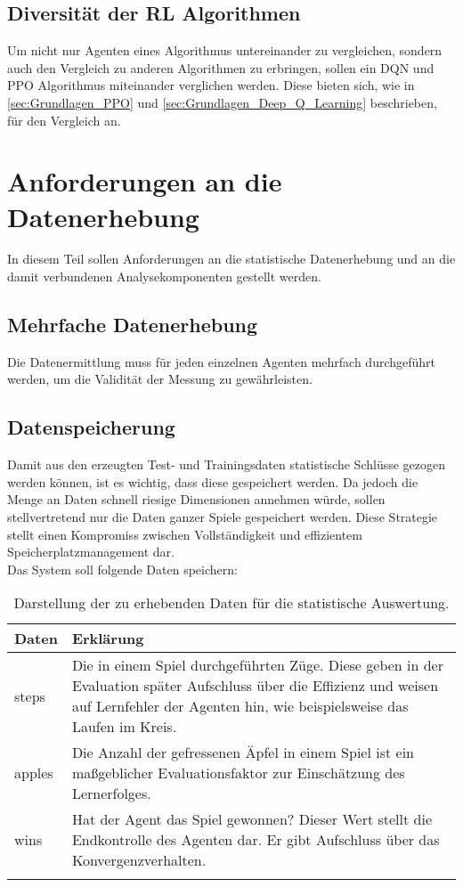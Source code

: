 \subsection{Diversität der RL Algorithmen} \label{subsec:Anforderungen_Diversität}
Um nicht nur Agenten eines Algorithmus untereinander zu vergleichen, sondern auch den Vergleich zu anderen Algorithmen zu erbringen, sollen ein DQN und PPO Algorithmus miteinander verglichen werden. 
Diese bieten sich, wie in \autoref{sec:Grundlagen_PPO} und \autoref{sec:Grundlagen_Deep_Q_Learning} beschrieben, für den Vergleich an.

\section{Anforderungen an die Datenerhebung} \label{sec:Anforderungen_an_die_Datenerhebung}
In diesem Teil sollen Anforderungen an die statistische Datenerhebung und an die damit verbundenen Analysekomponenten gestellt werden.

\subsection{Mehrfache Datenerhebung} \label{subsec:Anforderungen_mehrfache_Datenerhebung}
Die Datenermittlung muss für jeden einzelnen Agenten mehrfach durchgeführt werden, um die Validität der Messung zu gewährleisten. \citep[S. 135]{DL}

\subsection{Datenspeicherung} \label{subsec:Anforderungen_Datenspeicherung}
Damit aus den erzeugten Test- und Trainingsdaten statistische Schlüsse gezogen werden können, ist es wichtig, dass diese gespeichert werden. Da jedoch die Menge an Daten schnell riesige Dimensionen annehmen würde, sollen stellvertretend nur die Daten ganzer Spiele gespeichert werden. Diese Strategie stellt einen Kompromiss zwischen Vollständigkeit und effizientem Speicherplatzmanagement dar.\\
Das System soll folgende Daten speichern:
\begin{longtable}[h]{|p{4cm}|p{\linewidth - 5cm}|}
	\hline
	Daten & Erklärung \\
	\hline
	steps & Die in einem Spiel durchgeführten Züge. Diese geben in der Evaluation später Aufschluss über die Effizienz und weisen auf Lernfehler der Agenten hin, wie beispielsweise das Laufen im Kreis.\\
	\hline
	apples & Die Anzahl der gefressenen Äpfel in einem Spiel ist ein maßgeblicher Evaluationsfaktor zur Einschätzung des Lernerfolges.\\
	\hline
	wins & Hat der Agent das Spiel gewonnen? Dieser Wert stellt die Endkontrolle des Agenten dar. Er gibt Aufschluss über das Konvergenzverhalten.\\
	\hline
	\caption[Darstellung der zu erhebende Daten]{Darstellung der zu erhebenden Daten für die statistische Auswertung.}
	\label{tab:Anforderungen_Datenerhebung} 
\end{longtable}

